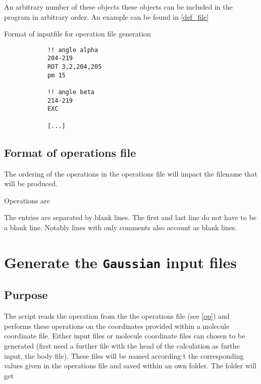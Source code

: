 \documentclass[parskip]{scrartcl}
\begin{document}
        An arbitrary number of these objects these objects can be included in the program in
        arbitrary order. An example can be found in \ref{def_file}
        
        \begin{listing}
        \caption{Format of inputfile for operation file generation\label{def_file}}
            \begin{verbatim}
            !! angle alpha
            204-219
            ROT 3,2,204,205
            pm 15

            !! angle beta
            214-219
            EXC

            [...]
            \end{verbatim}
        \end{listing}
    \subsection{Format of operations file \label{op}}

    The ordering of the operations in the operations file will impact the filename that will
    be produced.

    Operations are  

    The entries are separated by blank lines. The first and last line do not have 
    to be a blank line.
    Notably lines with only comments also account as blank lines.

\section{Generate the \texttt{Gaussian} input files}
    \subsection{Purpose}
        The script reads the operation from the the operations file (see \ref{op}) and performs
        these operations on the coordinates provided within a molecule coordinate file. 
        Either input files or molecule
        coordinate files can chosen to be generated (first need a further file with the head of
        the calculation as furthe input, the body file). These files will be named according t
        the
        corresponding values given in the operations file and saved within an own folder. The
        folder will get 
\end{document}
